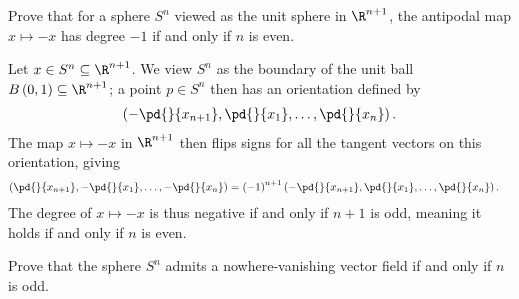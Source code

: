 \documentclass[10pt]{mypackage}
\begin{document}
\begin{problem}[Problem 9]
  Prove that for a sphere $S^{n}$ viewed as the unit sphere in $\R^{n+1}$, the antipodal map $x\mapsto -x$ has degree $-1$ if and only if $n$ is even.
\end{problem}
\begin{solution}
  Let $x\in S^{n}\subseteq \R^{n+1}$. We view $S^{n}$ as the boundary of the unit ball $B\left( 0,1 \right)\subseteq\R^{n+1}$; a point $p\in S^{n}$ then has an orientation defined by
  \begin{align*}
    \left( -\pd{}{x_{n+1}},\pd{}{x_{1}},\dots,\pd{}{x_{n}} \right).
  \end{align*}
  The map $x\mapsto -x$ in $\R^{n+1}$ then flips signs for all the tangent vectors on this orientation, giving
  \begin{align*}
    \left( \pd{}{x_{n+1}},-\pd{}{x_1},\dots,-\pd{}{x_{n}} \right) &= \left( -1 \right)^{n+1} \left( -\pd{}{x_{n+1}},\pd{}{x_1},\dots,\pd{}{x_n} \right).
  \end{align*}
  The degree of $x\mapsto -x$ is thus negative if and only if $n+1$ is odd, meaning it holds if and only if $n$ is even.
\end{solution}
\begin{problem}[Problem 10]
  Prove that the sphere $S^{n}$ admits a nowhere-vanishing vector field if and only if $n$ is odd.
\end{problem}
\end{document}
